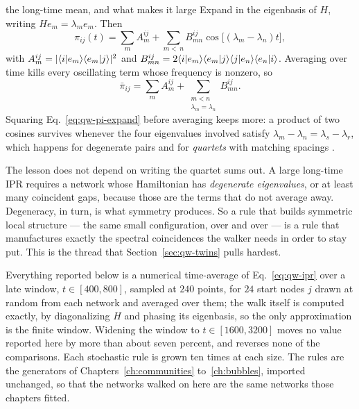 \begin{calculation}{the long-time mean, and what makes it large}
Expand in the eigenbasis of $H$, writing $He_m = \lambda_m e_m$. Then
\begin{equation}
  \pi_{ij}(t) = \sum_m A_m^{ij} + \sum_{m<\,n} B_{mn}^{ij}
               \cos\!\big[(\lambda_m-\lambda_n)t\big],
  \label{eq:qw-pi-expand}
\end{equation}
with $A_m^{ij}=|\langle i|e_m \rangle\langle e_m|j \rangle|^2$ and
$B_{mn}^{ij}=2\langle i|e_m \rangle\langle e_m|j \rangle\langle j|e_n \rangle\langle e_n|i \rangle$. Averaging
over time kills every oscillating term whose frequency is nonzero, so
\begin{equation}
  \bar\pi_{ij} = \sum_m A_m^{ij}
    + \sum_{\substack{m<n\\ \lambda_m=\lambda_n}} B_{mn}^{ij} .
  \label{eq:qw-pibar}
\end{equation}
Squaring Eq.~\eqref{eq:qw-pi-expand} before averaging keeps more: a product of two
cosines survives whenever the four eigenvalues involved satisfy
$\lambda_m-\lambda_n=\lambda_s-\lambda_r$, which happens for degenerate pairs and
for \emph{quartets} with matching spacings \citep{boettcher2025localization}.

The lesson does not depend on writing the quartet sums out. A large long-time IPR
requires a network whose Hamiltonian has \emph{degenerate eigenvalues}, or at least
many coincident gaps, because those are the terms that do not average away.
Degeneracy, in turn, is what symmetry produces. So a rule that builds symmetric
local structure --- the same small configuration, over and over --- is a rule that
manufactures exactly the spectral coincidences the walker needs in order to stay
put. This is the thread that Section~\ref{sec:qw-twins} pulls hardest.
\end{calculation}

Everything reported below is a numerical time-average of Eq.~\eqref{eq:qw-ipr} over
a late window, $t\in[400,800]$, sampled at $240$ points, for $24$ start nodes $j$
drawn at random from each network and averaged over them; the walk itself is
computed exactly, by diagonalizing $H$ and phasing its eigenbasis, so the only
approximation is the finite window. Widening the window to $t\in[1600,3200]$ moves
no value reported here by more than about seven percent, and reverses none of the
comparisons. Each stochastic rule is grown ten times at each size. The rules are
the generators of Chapters~\ref{ch:communities} to~\ref{ch:bubbles}, imported
unchanged, so that the networks walked on here are the same networks those chapters
fitted.

